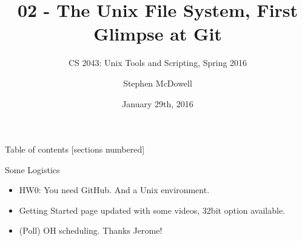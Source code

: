 %
%
%
%


%
%
\title{02 \-- The Unix File System, First Glimpse at Git}
\subtitle{CS 2043: Unix Tools and Scripting, Spring 2016 \cite{prevSemesters}}
\date{January 29th, 2016}
\author{Stephen McDowell}


\maketitle

\begin{frame}{Table of contents}
  [sections numbered]
  \tableofcontents[hideallsubsections]
\end{frame}

\begin{frame}{Some Logistics}
  \begin{itemize}[<+- | alert@+>]
    \item \alert<4>{HW0: You need GitHub.  And a Unix environment.}
    \item Getting Started page updated with some videos, 32bit option available.
    \item (Poll) OH scheduling.  Thanks Jerome!
  \end{itemize}
\end{frame}

